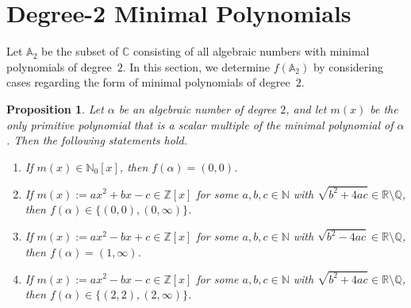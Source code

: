 \documentclass[11pt]{amsart}
\newtheorem{proposition}[theorem]{Proposition}
\theoremstyle{definition}
\theoremstyle{remark}
\numberwithin{equation}{section}
\newcommand{\aaa}{\mathbb{A}}
\newcommand{\cc}{\mathbb{C}}
\newcommand{\nn}{\mathbb{N}}
\newcommand{\zz}{\mathbb{Z}}
\begin{document}
\bigskip
\section{Degree-2 Minimal Polynomials}
\label{sec:pair realizable by degree-2 algebraic numbers}

Let $\aaa_2$ be the subset of $\cc$ consisting of all algebraic numbers with minimal polynomials of degree~$2$. In this section, we determine $f(\aaa_2)$ by considering cases regarding the form of minimal polynomials of degree~$2$.

\begin{proposition} \label{prop:deg-2 minimal polynomial}
    Let $\alpha$ be an algebraic number of degree $2$, and let $m(x)$ be the only primitive polynomial that is a scalar multiple of the minimal polynomial of $\alpha$. Then the following statements hold.
    \begin{enumerate}
    	\item If $m(x) \in \nn_0[x]$, then $f(\alpha) = (0,0)$.
    	\smallskip
    	
        \item If $m(x) := ax^2+bx-c \in \zz[x]$ for some $a,b,c\in \mathbb{N}$ with $\sqrt{b^2+4ac}\in \mathbb{R}\setminus \mathbb{Q}$, then $f(\alpha) \in \{(0,0), (0,\infty)\}$.
        \smallskip

        \item If $m(x) := ax^2-bx+c \in \zz[x]$ for some $a,b,c \in \mathbb{N}$ with $\sqrt{b^2-4ac} \in \mathbb{R} \setminus \mathbb{Q}$, then $f(\alpha) = (1,\infty)$.
        \smallskip

        \item If $m(x) := ax^2-bx-c \in \zz[x]$ for some $a,b,c\in \mathbb{N}$ with $\sqrt{b^2+4ac} \in \mathbb{R} \setminus \mathbb{Q}$, then $f(\alpha) \in \{(2,2), (2,\infty)\}$.
    \end{enumerate}
\end{proposition}
\end{document}
